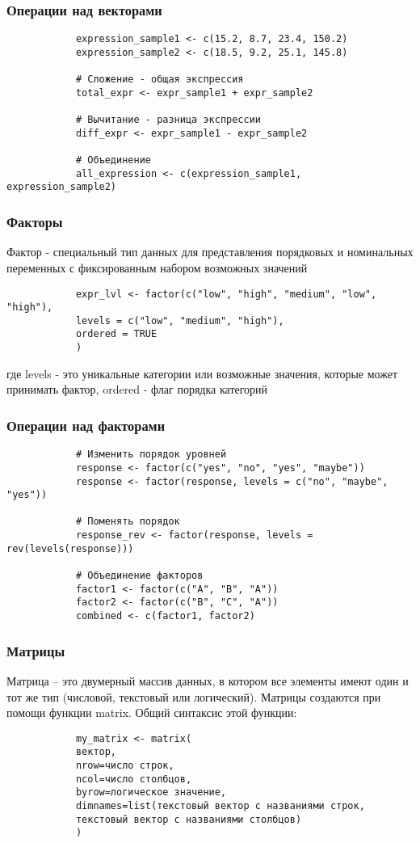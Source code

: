 \documentclass[10pt]{beamer}
\begin{document}
	\begin{frame}[fragile]
		\frametitle{Операции над векторами}
		\begin{verbatim}
			expression_sample1 <- c(15.2, 8.7, 23.4, 150.2)
			expression_sample2 <- c(18.5, 9.2, 25.1, 145.8)
			
			# Сложение - общая экспрессия
			total_expr <- expr_sample1 + expr_sample2
			
			# Вычитание - разница экспрессии
			diff_expr <- expr_sample1 - expr_sample2
			
			# Объединение
			all_expression <- c(expression_sample1, expression_sample2)
		\end{verbatim}
	\end{frame}
	
	
	\begin{frame}[fragile]
		\frametitle{Факторы}
		Фактор - специальный тип данных для представления порядковых и номинальных переменных с фиксированным набором возможных значений
		\begin{verbatim}
			expr_lvl <- factor(c("low", "high", "medium", "low", "high"),
			levels = c("low", "medium", "high"), 
			ordered = TRUE
			)
		\end{verbatim}
		где levels - это уникальные категории или возможные значения, которые может принимать фактор, ordered - флаг порядка категорий
	\end{frame}
	
	\begin{frame}[fragile]
		\frametitle{Операции над факторами}
		\begin{verbatim}
			# Изменить порядок уровней
			response <- factor(c("yes", "no", "yes", "maybe"))
			response <- factor(response, levels = c("no", "maybe", "yes"))
			
			# Поменять порядок
			response_rev <- factor(response, levels = rev(levels(response)))
			
			# Объединение факторов
			factor1 <- factor(c("A", "B", "A"))
			factor2 <- factor(c("B", "C", "A"))
			combined <- c(factor1, factor2)		
		\end{verbatim}
	\end{frame}
	
	
	\begin{frame}[fragile]
		\frametitle{Матрицы}
		Матрица – это двумерный массив данных, в котором все элементы имеют один и тот же тип (числовой, текстовый или логический). Матрицы создаются при помощи функции matrix. Общий синтаксис этой функции:
		\begin{verbatim}
			my_matrix <- matrix(
			вектор, 
			nrow=число строк, 
			ncol=число столбцов, 
			byrow=логическое значение, 
			dimnames=list(текстовый вектор с названиями строк, 
			текстовый вектор с названиями столбцов)
			)
		\end{verbatim}
		
		
	\end{frame}
	
\end{document}
